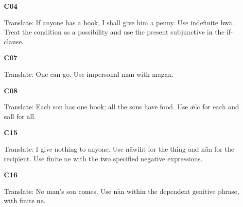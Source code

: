 \par\begin{minipage}{\linewidth}\raggedright
\textbf{C04}

Translate: If anyone has a book, I shall give him a penny. Use indefinite hwā. Treat the condition as a possibility and use the present subjunctive in the if-clause.

\end{minipage}\par\addvspace{4pt}

\par\begin{minipage}{\linewidth}\raggedright
\textbf{C07}

Translate: One can go. Use impersonal man with magan.

\end{minipage}\par\addvspace{4pt}

\par\begin{minipage}{\linewidth}\raggedright
\textbf{C08}

Translate: Each son has one book; all the sons have food. Use ǣlc for each and eall for all.

\end{minipage}\par\addvspace{4pt}

\par\begin{minipage}{\linewidth}\raggedright
\textbf{C15}

Translate: I give nothing to anyone. Use nāwiht for the thing and nān for the recipient. Use finite ne with the two specified negative expressions.

\end{minipage}\par\addvspace{4pt}

\par\begin{minipage}{\linewidth}\raggedright
\textbf{C16}

Translate: No man’s son comes. Use nān within the dependent genitive phrase, with finite ne.

\end{minipage}\par\addvspace{4pt}


